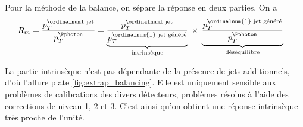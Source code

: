 Pour la méthode de la balance, on sépare la réponse en deux parties. On a
\begin{align*}
  R_m &= \frac{\ptfjet}{\ptg} = \underbrace{ \frac{\ptfjet}{p_T^{\text{\ordinalnum{1} jet généré}}} }_{\text{intrinsèque}} \; \times \; \underbrace{ \frac{p_T^{\text{\ordinalnum{1} jet généré}}}{\ptg} }_{\text{déséquilibre}}
\end{align*}

La partie intrinsèque n'est pas dépendante de la présence de jets additionnels, d'où l'allure plate \cref{fig:extrap_balancing}. Elle est uniquement sensible aux problèmes de calibrations des divers détecteurs, problèmes résolus à l'aide des corrections de niveau 1, 2 et 3. C'est ainsi qu'on obtient une réponse intrinsèque très proche de l'unité.